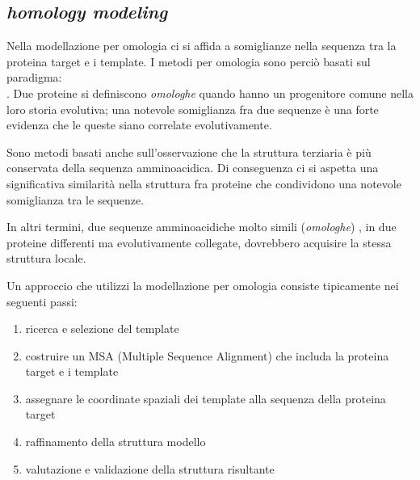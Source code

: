 \subsection{\textit{homology modeling}}
{
	Nella modellazione per omologia ci si affida a somiglianze nella sequenza tra la proteina target e i template. I metodi per omologia sono perciò basati sul paradigma: \\
	.
	Due proteine si definiscono \textit{omologhe} quando hanno un progenitore comune nella loro storia evolutiva; una notevole somiglianza fra due sequenze è una forte evidenza che le queste siano correlate evolutivamente.
	
	\par Sono metodi basati anche sull'osservazione che la struttura terziaria è più conservata della sequenza amminoacidica. Di conseguenza ci si aspetta una significativa similarità nella struttura fra proteine che condividono una notevole somiglianza tra le sequenze.
	
	\par In altri termini, due sequenze amminoacidiche molto simili (\textit{omologhe}) , in due proteine differenti ma evolutivamente collegate, dovrebbero acquisire la stessa struttura locale.
	
	\par Un approccio che utilizzi la modellazione per omologia consiste tipicamente nei seguenti passi:
	\begin{enumerate}
		\item ricerca e selezione del template
		\item costruire un MSA (Multiple Sequence Alignment) che includa la proteina target e i template
		\item assegnare le coordinate spaziali dei template alla sequenza della proteina target
		\item raffinamento della struttura modello
		\item valutazione e validazione della struttura risultante
	\end{enumerate}
	
}
